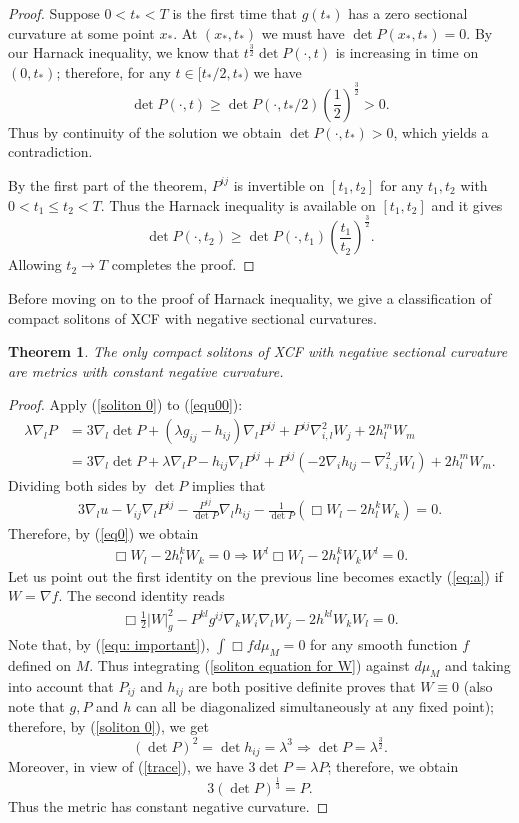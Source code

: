 \documentclass{amsart}
\newtheorem{theorem}{Theorem}
\theoremstyle{definition}
\theoremstyle{remark}
\numberwithin{equation}{section}
\begin{document}
\begin{proof}
Suppose $0<t_{\ast}<T$ is the first time that $g(t_{\ast})$ has a zero sectional curvature at some point $x_{\ast}$. At $(x_{\ast},t_{\ast})$ we must have $\det P(x_{\ast},t_{\ast})=0.$
By our Harnack inequality, we know that $t^{\frac{3}{2}}\det P(\cdot,t) $ is increasing in time on $(0,t_{\ast})$; therefore, for any $t\in [t_{\ast}/2, t_{\ast})$ we have
\[\det P(\cdot,t)\geq \det P(\cdot,t_{\ast}/2)\left(\frac{1}{2}\right)^{\frac{3}{2}}>0.\]
Thus by continuity of the solution we obtain $\det P(\cdot,t_{\ast})>0$, which yields a contradiction.

By the first part of the theorem, $P^{ij}$ is invertible on $[t_1,t_2]$ for any $t_1,t_2$ with $0<t_1\leq t_2<T.$ Thus the Harnack inequality is available on $[t_1,t_2]$ and it gives
\[\det P(\cdot,t_2)\geq \det P(\cdot,t_1)\left(\frac{t_1}{t_2}\right)^{\frac{3}{2}}.\]
Allowing $t_2\to T$ completes the proof.
\end{proof}
Before moving on to the proof of Harnack inequality, we give a classification of compact solitons of XCF with negative sectional curvatures.
\begin{theorem}
The only compact solitons of XCF with negative sectional curvature are metrics with constant negative curvature.
\end{theorem}
\begin{proof}
Apply (\ref{soliton 0}) to (\ref{equ00}):
\begin{align*}
\lambda \nabla_l P&=3\nabla_l\det P+(\lambda g_{ij}-h_{ij})\nabla_l P^{ij}+P^{ij}\nabla^2_{i,l}W_j+2h_l^mW_m\\
&=3\nabla_l\det P+\lambda \nabla_l P-h_{ij}\nabla_l P^{ij}+P^{ij}(-2\nabla_ih_{lj}-\nabla^2_{i,j}W_l)+2h_l^mW_m.
\end{align*}
Dividing both sides by $\det P$ implies that
\begin{align*}
3\nabla_lu-V_{ij}\nabla_l P^{ij}-\frac{P^{ij}}{\det P}\nabla_lh_{ij}-\frac{1}{\det P}(\Box W_l-2h_l^kW_k)=0.
\end{align*}
Therefore, by (\ref{eq0}) we obtain
\begin{align*}
\Box W_l-2h_l^kW_k=0\Rightarrow W^l\Box W_l-2h_l^kW_kW^l=0.
\end{align*}
Let us point out the first identity on the previous line becomes exactly (\ref{eq:a}) if $W=\nabla f.$
The second identity reads
\begin{align}\label{soliton equation for W}
\Box \frac{1}{2}|W|_g^2-P^{kl}g^{ij}\nabla_kW_i\nabla_lW_j-2h^{kl}W_kW_l=0.
\end{align}
Note that, by (\ref{equ: important}), $\int \Box fd\mu_{M}=0$ for any smooth function $f$ defined on $M$. Thus integrating (\ref{soliton equation for W}) against $d\mu_{M}$ and taking into account that $P_{ij}$ and $h_{ij}$ are both positive definite proves that $W\equiv0$ (also note that $g,P$ and $h$ can all be diagonalized simultaneously at any fixed point); therefore, by (\ref{soliton 0}), we get
\[(\det P)^2=\det h_{ij}=\lambda ^3\Rightarrow \det P=\lambda^{\frac{3}{2}}.\]
Moreover, in view of (\ref{trace}), we have $3\det P=\lambda P$; therefore, we obtain $$3(\det P)^{\frac{1}{3}}=P.$$ Thus the metric has constant negative curvature.
\end{proof}
\end{document}
